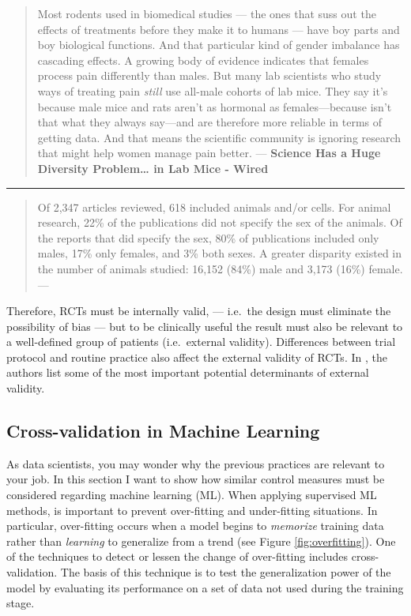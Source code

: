 \documentclass[
]{book}
\begin{document}
\begin{quote}
Most rodents used in biomedical studies --- the ones that suss out the effects of treatments before they make it to humans --- have boy parts and boy biological functions. And that particular kind of gender imbalance has cascading effects. A growing body of evidence indicates that females process pain differently than males. But many lab scientists who study ways of treating pain \emph{still }use all-male cohorts of lab mice. They say it's because male mice and rats aren't as hormonal as females---because isn't that what they always say---and are therefore more reliable in terms of getting data. And that means the scientific community is ignoring research that might help women manage pain better. --- \textbf{Science Has a Huge Diversity Problem\ldots{} in Lab Mice - Wired}
\end{quote}

\begin{center}\rule{0.5\linewidth}{0.5pt}\end{center}

\begin{quote}
Of 2,347 articles reviewed, 618 included animals and/or cells. For animal research, 22\% of the publications did not specify the sex of the animals. Of the reports that did specify the sex, 80\% of publications included only males, 17\% only females, and 3\% both sexes. A greater disparity existed in the number of animals studied: 16,152 (84\%) male and 3,173 (16\%) female. --- \citep{yoon2014sex}
\end{quote}

Therefore, RCTs must be internally valid, --- i.e.~the design must eliminate the possibility of bias --- but to be clinically useful the result must also be relevant to a well-defined group of patients (i.e.~external validity). Differences between trial protocol and routine practice also affect the external validity of RCTs. In \citep{rothwell2006factors}, the authors list some of the most important potential determinants of external validity.

\hypertarget{cross-validation-in-machine-learning}{%
\subsection{Cross-validation in Machine Learning}\label{cross-validation-in-machine-learning}}

As data scientists, you may wonder why the previous practices are relevant to your job. In this section I want to show how similar control measures must be considered regarding machine learning (ML). When applying supervised ML methods, is important to prevent over-fitting and under-fitting situations. In particular, over-fitting occurs when a model begins to \emph{memorize} training data rather than \emph{learning} to generalize from a trend (see Figure \ref{fig:overfitting}). One of the techniques to detect or lessen the change of over-fitting includes cross-validation. The basis of this technique is to test the generalization power of the model by evaluating its performance on a set of data not used during the training stage.
\end{document}
